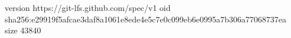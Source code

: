 version https://git-lfs.github.com/spec/v1
oid sha256:e29919f5afcae3daf8a1061e8ede4e5c7e0c099eb6e0995a7b306a77068737ea
size 43840
